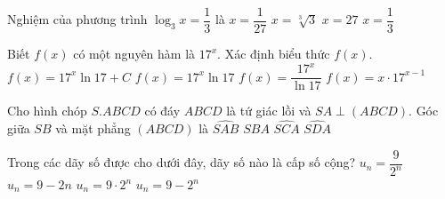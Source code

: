 \begin{ex}
	Nghiệm của phương trình $\log _{3}x=\dfrac{1}{3}$ là
	\choice
	{$x=\dfrac{1}{27}$}
	{\True $x=\sqrt[3]{3}$}
	{$x=27$}
	{$x=\dfrac{1}{3}$}
\end{ex}

\begin{ex}
	Biết $f(x)$ có một nguyên hàm là $17^x$. Xác định biểu thức $f(x)$.
	\choice
	{$f(x)=17^x\ln 17+C$}
	{\True $f(x)=17^x\ln 17$}
	{$f(x)=\dfrac{17^x}{\ln 17}$}
	{$f(x)=x\cdot 17^{x-1}$}
\end{ex}

\begin{ex}
	Cho hình chóp $S.ABCD$ có đáy $ABCD$ là tứ giác lồi và $SA\perp (ABCD)$. Góc giữa $SB$ và mặt phẳng $(ABCD)$ là
	\choice
	{$\widehat{SAB}$}
	{\True $\widehat{SBA}$}
	{$\widehat{SCA}$}
	{$\widehat{SDA}$}
\end{ex}

\begin{ex}
	Trong các dãy số được cho dưới đây, dãy số nào là cấp số cộng?
	\choice
	{$u_n=\dfrac{9}{2^n}$}
	{\True $u_n=9-2n$}
	{$u_n=9\cdot 2^n$}
	{$u_n=9-2^n$}
\end{ex}

